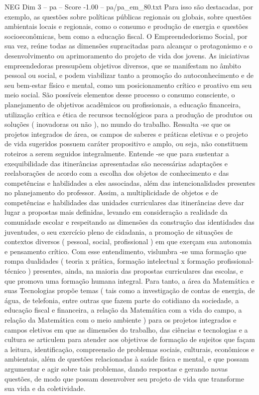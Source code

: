 \begin{textsample}{NEG Dim 3 – pa – Score -1.00 – pa/pa\_em\_80.txt}
Para isso são destacadas, por exemplo, as questões sobre políticas públicas regionais ou globais, sobre questões ambientais locais e regionais, como o consumo e produção de energia e questões socioeconômicas, bem como a educação fiscal.
O Empreendedorismo Social, por sua vez, reúne todas as dimensões supracitadas para alcançar o protagonismo e o desenvolvimento ou aprimoramento do projeto de vida dos jovens.
As iniciativas empreendedoras pressupõem objetivos diversos, que se manifestam no âmbito pessoal ou social, e podem viabilizar tanto a promoção do autoconhecimento e de seu bem-estar físico e mental, como um posicionamento crítico e proativo em seu meio social.
São possíveis elementos desse processo o consumo consciente, o planejamento de objetivos acadêmicos ou profissionais, a educação financeira, utilização crítica e ética de recursos tecnológicos para a produção de produtos ou soluções ( inovadoras ou não ), no mundo do trabalho.
Ressalta -se que os projetos integrados de área, os campos de saberes e práticas eletivas e o projeto de vida sugeridos possuem caráter propositivo e amplo, ou seja, não constituem roteiros a serem seguidos integralmente.
Entende -se que para sustentar a exequibilidade das itinerâncias apresentadas são necessárias adaptações e reelaborações de acordo com a escolha dos objetos de conhecimento e das competências e habilidades a eles associadas, além das intencionalidades presentes no planejamento do professor.
Assim, a multiplicidade de objetos e de competências e habilidades das unidades curriculares das itinerâncias deve dar lugar a propostas mais definidas, levando em consideração a realidade da comunidade escolar e respeitando as dimensões da construção das identidades das juventudes, o seu exercício pleno de cidadania, a promoção de situações de contextos diversos ( pessoal, social, profissional ) em que exerçam sua autonomia e pensamento crítico.
Com esse entendimento, vislumbra -se uma formação que rompa dualidades ( teoria x prática, formação intelectual x formação profissional-técnico ) presentes, ainda, na maioria das propostas curriculares das escolas, e que promova uma formação humana integral.
Para tanto, a área da Matemática e suas Tecnologias propõe temas ( tais como a investigação de contas de energia, de água, de telefonia, entre outras que fazem parte do cotidiano da sociedade, a educação fiscal e financeira, a relação da Matemática com a vida do campo, a relação da Matemática com o meio ambiente ) para os projetos integrados e campos eletivos em que as dimensões do trabalho, das ciências e tecnologias e a cultura se articulem para atender aos objetivos de formação de sujeitos que façam a leitura, identificação, compreensão de problemas sociais, culturais, econômicos e ambientais, além de questões relacionadas à saúde física e mental, e que possam argumentar e agir sobre tais problemas, dando respostas e gerando novas questões, de modo que possam desenvolver seu projeto de vida que transforme sua vida e da coletividade.

\end{textsample}
